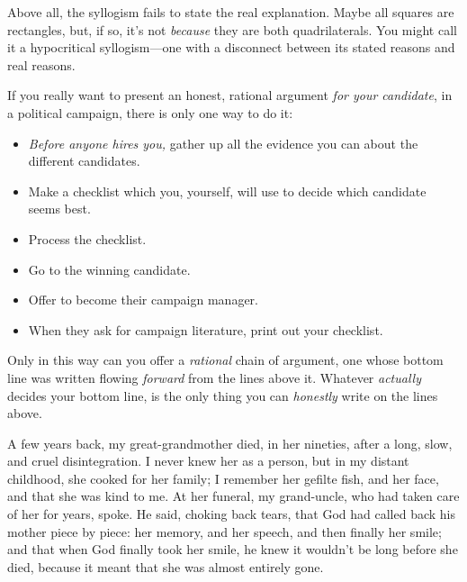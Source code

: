 {
 Above all, the syllogism fails to state the real explanation.
Maybe all squares are rectangles, but, if so, it's not
\textit{because} they are both quadrilaterals. You might call it a
hypocritical syllogism---one with a disconnect between its stated
reasons and real reasons.}

{
 If you really want to present an honest, rational argument
\textit{for your candidate}, in a political campaign, there is only one
way to do it:}

\begin{itemize}
\item {
 \textit{Before anyone hires you,} gather up all the evidence you
can about the different candidates.}

\item {
 Make a checklist which you, yourself, will use to decide which
candidate seems best.}

\item {
 Process the checklist.}

\item {
 Go to the winning candidate.}

\item {
 Offer to become their campaign manager.}

\item {
  When they ask for campaign literature, print out your checklist.}
\end{itemize}

{
 Only in this way can you offer a \textit{rational} chain of
argument, one whose bottom line was written flowing \textit{forward}
from the lines above it. Whatever \textit{actually} decides your bottom
line, is the only thing you can \textit{honestly} write on the lines
above.}

\myendsectiontext


{
 A few years back, my great-grandmother died, in her nineties,
after a long, slow, and cruel disintegration. I never knew her as a
person, but in my distant childhood, she cooked for her family; I
remember her gefilte fish, and her face, and that she was kind to me.
At her funeral, my grand-uncle, who had taken care of her for years,
spoke. He said, choking back tears, that God had called back his mother
piece by piece: her memory, and her speech, and then finally her smile;
and that when God finally took her smile, he knew it
wouldn't be long before she died, because it meant that
she was almost entirely gone. }

